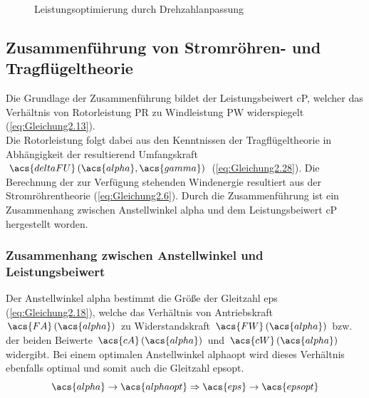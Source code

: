 \begin{figure}[H]
   \centering
   \caption[Leistungsoptimierung durch Drehzahlanpassung]{Leistungsoptimierung durch Drehzahlanpassung \cite{SkriptSchulte}}
   \label{fig:Bild2.12}
\end{figure}

\subsection{Zusammenführung von Stromröhren- und Tragflügeltheorie}
Die Grundlage der Zusammenführung bildet der Leistungsbeiwert \acs{cP}, welcher das Verhältnis von Rotorleistung \acs{PR} zu Windleistung \acs{PW} widerspiegelt (\autoref{eq:Gleichung2.13}).\\
Die Rotorleistung folgt dabei aus den Kenntnissen der Tragflügeltheorie in Abhängigkeit der resultierend Umfangskraft $\acs{deltaFU}\left(\acs{alpha}, \acs{gamma}\right)$ (\autoref{eq:Gleichung2.28}). Die Berechnung der zur Verfügung stehenden Windenergie resultiert aus der Stromröhrentheorie (\autoref{eq:Gleichung2.6}). Durch die Zusammenführung ist ein Zusammenhang zwischen Anstellwinkel \acs{alpha} und dem Leistungsbeiwert \acs{cP} hergestellt worden.

\subsubsection{Zusammenhang zwischen Anstellwinkel und Leistungsbeiwert}
Der Anstellwinkel \acs{alpha} bestimmt die Größe der Gleitzahl \acs{eps} (\autoref{eq:Gleichung2.18}), welche das Verhältnis von Antriebskraft $\acs{FA}\left(\acs{alpha}\right)$ zu Widerstandskraft $\acs{FW}\left(\acs{alpha}\right)$ bzw. der beiden Beiwerte $\acs{cA}\left(\acs{alpha}\right)$ und $\acs{cW}\left(\acs{alpha}\right)$ widergibt. Bei einem optimalen Anstellwinkel \acs{alphaopt} wird dieses Verhältnis ebenfalls optimal und somit auch die Gleitzahl \acs{epsopt}.
\begin{equation*}
    \acs{alpha} \rightarrow \acs{alphaopt} \Rightarrow \acs{eps} \rightarrow \acs{epsopt}
\end{equation*}

